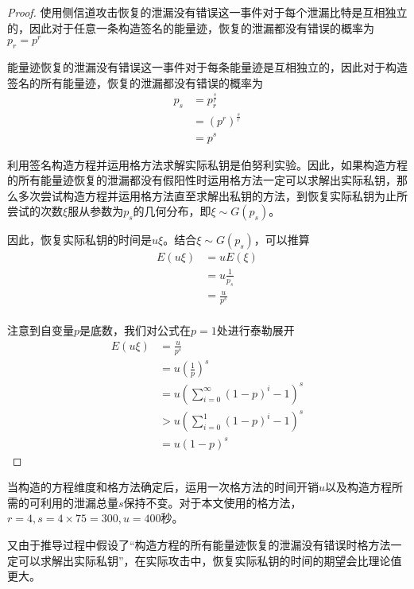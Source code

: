{\begin{proof}
		使用侧信道攻击恢复的泄漏没有错误这一事件对于每个泄漏比特是互相独立的，因此对于任意一条构造签名的能量迹，恢复的泄漏都没有错误的概率为$p_r=p^r$
	
		能量迹恢复的泄漏没有错误这一事件对于每条能量迹是互相独立的，因此对于构造签名的所有能量迹，恢复的泄漏都没有错误的概率为\begin{align*}
			p_s&=p_r^{\frac sr}\\
			&=\left(p^r \right) ^{\frac sr}\\
			&=p^s
		\end{align*}
	
		利用签名构造方程并运用格方法求解实际私钥是伯努利实验。因此，如果构造方程的所有能量迹恢复的泄漏都没有假阳性时运用格方法一定可以求解出实际私钥，那么多次尝试构造方程并运用格方法直至求解出私钥的方法，到恢复实际私钥为止所尝试的次数$\xi$服从参数为$p_s$的几何分布，即$\xi\sim G(p_s)$。
		
		因此，恢复实际私钥的时间是$u\xi$。结合$\xi\sim G(p_s)$，可以推算\begin{align*}
			E(u\xi)&=uE(\xi)\\
			&=u\frac{1}{p_s}\\
			&=\frac{u}{p^s}\\
		\end{align*}
	
		注意到自变量$p$是底数，我们对公式在$p=1$处进行泰勒展开\begin{align*}
			E(u\xi)&=\frac{u}{p^s}\\
			&=u\left( \frac1p\right) ^s\\
			&=u\left( \sum\limits_{i=0}^{\infty}\left( 1-p\right) ^i-1\right) ^s\\
			&>u\left( \sum\limits_{i=0}^{1}\left( 1-p\right) ^i-1\right) ^s\\
			&=u\left( 1-p\right) ^s
		\end{align*}

	\end{proof}
	当构造的方程维度和格方法确定后，运用一次格方法的时间开销$u$以及构造方程所需的可利用的泄漏总量$s$保持不变。对于本文使用的格方法，$r=4,s=4\times75=300,u=400$秒。%
	
	又由于推导过程中假设了“构造方程的所有能量迹恢复的泄漏没有错误时格方法一定可以求解出实际私钥”，在实际攻击中，恢复实际私钥的时间的期望会比理论值更大。
	
}
